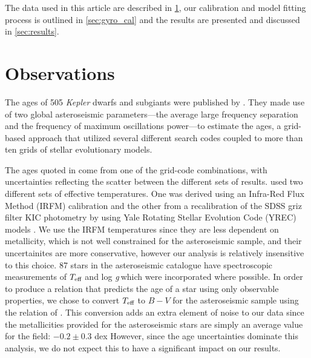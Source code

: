 \documentclass[10pt,preprint]{aastex}
\newcommand{\logg}{log \emph{g}}
\newcommand{\teff}{$T_{\rm{eff}}$}
\begin{document}
The data used in this article are described in \textsection \ref{sec:data}, our calibration and model fitting process is outlined in \textsection \ref{sec:gyro_cal} and the results are presented and discussed in \textsection \ref{sec:results}.

\section{Observations}
\label{sec:data}

The ages of 505 {\it Kepler} dwarfs and subgiants were published by \citet{Chaplin2014}.
They made use of two global asteroseismic parameters---the average large frequency separation and the frequency of maximum oscillations power---to estimate the ages, a grid-based approach that utilized several different search codes coupled to more than ten grids of stellar evolutionary models.

The ages quoted in \citet{Chaplin2014} come from one of the grid-code combinations, with uncertainties reflecting the scatter between the different sets of results.
\citet{Chaplin2014} used two different sets of effective temperatures.
One was derived using an Infra-Red Flux Method (IRFM) calibration \citep{Casagrande2010, SilvaAguirre2012} and the other from a recalibration of the SDSS griz filter KIC photometry by \citet{Pinsonneault2012} using Yale Rotating Stellar Evolution Code (YREC) models \citep{Demarque2004}.
We use the IRFM temperatures since they are less dependent on metallicity, which is not well constrained for the asteroseismic sample, and their uncertainites are more conservative, however our analysis is relatively insensitive to this choice.
87 stars in the asteroseismic catalogue have spectroscopic measurements of \teff$~$and \logg$~$which were incorporated where possible.
In order to produce a relation that predicts the age of a star using only observable properties, we chose to convert \teff$~$to $B-V$ for the asteroseismic sample using the relation of \citet{Sekiguchi2000}.
This conversion adds an extra element of noise to our data since the metallicities provided for the asteroseismic stars are simply an average value for the field: $-0.2\pm0.3$ dex \citep[see e.g.][]{Silva_Aguirre2011}
However, since the age uncertainties dominate this analysis, we do not expect this to have a significant impact on our results.
\end{document}
